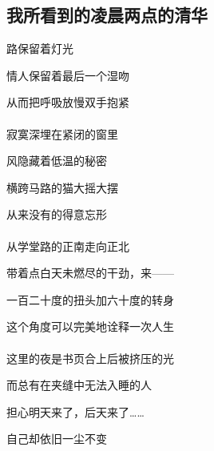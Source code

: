 \documentclass[openany,scheme = chinese, linespread = 1.5]{ctexbook}
\begin{document}
\subsection*{我所看到的凌晨两点的清华}
\begin{center}
路保留着灯光

情人保留着最后一个湿吻

从而把呼吸放慢双手抱紧\\
\ \\
寂寞深埋在紧闭的窗里

风隐藏着低温的秘密

横跨马路的猫大摇大摆

从来没有的得意忘形\\
\ \\
从学堂路的正南走向正北

带着点白天未燃尽的干劲，来——

一百二十度的扭头加六十度的转身

这个角度可以完美地诠释一次人生\\
\ \\
这里的夜是书页合上后被挤压的光

而总有在夹缝中无法入睡的人

担心明天来了，后天来了……

自己却依旧一尘不变

\end{center}
\end{document}
